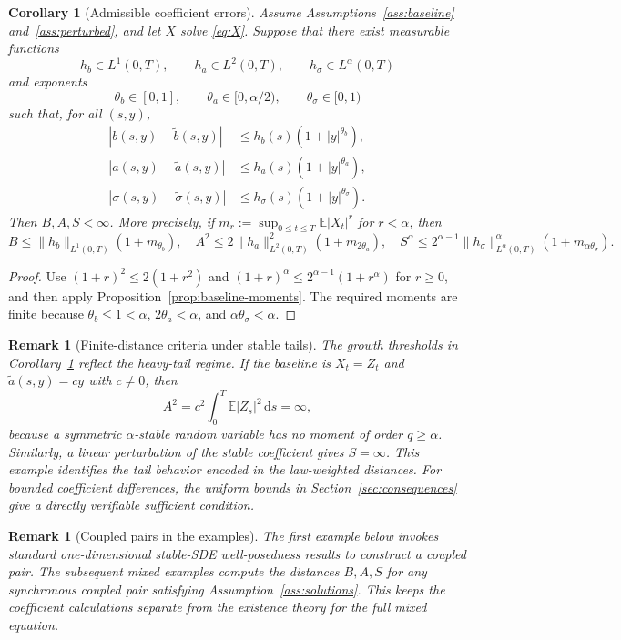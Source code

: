 \documentclass[11pt]{article}
\newtheorem{corollary}[theorem]{Corollary}
\newtheorem{remark}[theorem]{Remark}
\newcommand{\E}{\mathbb{E}}
\newcommand{\1}{\mathbf{1}}
\newcommand{\dd}{\,\mathrm{d}}
\newcommand{\wt}{\tilde}
\begin{document}
\begin{corollary}[Admissible coefficient errors]\label{cor:admissible-distances}
Assume Assumptions~\ref{ass:baseline} and~\ref{ass:perturbed}, and let $X$ solve \eqref{eq:X}. Suppose that there exist measurable functions
\[
  h_b\in L^1(0,T),\qquad h_a\in L^2(0,T),\qquad h_\sigma\in L^\alpha(0,T)
\]
and exponents
\[
  \theta_b\in[0,1],\qquad \theta_a\in[0,\alpha/2),\qquad \theta_\sigma\in[0,1)
\]
such that, for all $(s,y)$,
\begin{align*}
|b(s,y)-\wt b(s,y)|&\le h_b(s)(1+|y|^{\theta_b}),\\
|a(s,y)-\wt a(s,y)|&\le h_a(s)(1+|y|^{\theta_a}),\\
|\sigma(s,y)-\wt\sigma(s,y)|&\le h_\sigma(s)(1+|y|^{\theta_\sigma}).
\end{align*}
Then $B,A,S<\infty$. More precisely, if $m_r:=\sup_{0\le t\le T}\E|X_t|^r$ for $r<\alpha$, then
\[
B\le \|h_b\|_{L^1(0,T)}(1+m_{\theta_b}),\quad
A^2\le 2\|h_a\|_{L^2(0,T)}^2(1+m_{2\theta_a}),\quad
S^\alpha\le 2^{\alpha-1}\|h_\sigma\|_{L^\alpha(0,T)}^\alpha(1+m_{\alpha\theta_\sigma}).
\]
\end{corollary}

\begin{proof}
Use $(1+r)^2\le2(1+r^2)$ and $(1+r)^\alpha\le2^{\alpha-1}(1+r^\alpha)$ for $r\ge0$, and then apply Proposition~\ref{prop:baseline-moments}. The required moments are finite because $\theta_b\le1<\alpha$, $2\theta_a<\alpha$, and $\alpha\theta_\sigma<\alpha$.
\end{proof}

\begin{remark}[Finite-distance criteria under stable tails]
The growth thresholds in Corollary~\ref{cor:admissible-distances} reflect the heavy-tail regime. If the baseline is $X_t=Z_t$ and $\wt a(s,y)=c y$ with $c\ne0$, then
\[
  A^2=c^2\int_0^T\E|Z_s|^2\dd s=\infty,
\]
because a symmetric $\alpha$-stable random variable has no moment of order $q\ge\alpha$. Similarly, a linear perturbation of the stable coefficient gives $S=\infty$. This example identifies the tail behavior encoded in the law-weighted distances. For bounded coefficient differences, the uniform bounds in Section~\ref{sec:consequences} give a directly verifiable sufficient condition.
\end{remark}


\begin{remark}[Coupled pairs in the examples]
The first example below invokes standard one-dimensional stable-SDE well-posedness results to construct a coupled pair. The subsequent mixed examples compute the distances $B,A,S$ for any synchronous coupled pair satisfying Assumption~\ref{ass:solutions}. This keeps the coefficient calculations separate from the existence theory for the full mixed equation.
\end{remark}
\end{document}
